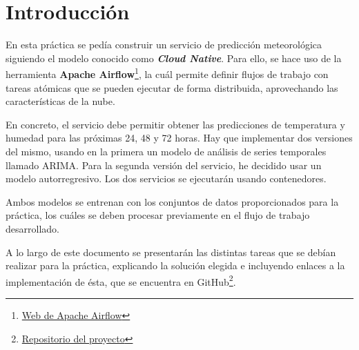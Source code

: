 \section{Introducción}
En esta práctica se pedía construir un servicio de predicción meteorológica
siguiendo el modelo conocido como \textbf{\textit{Cloud Native}}. Para ello,
se hace uso de la herramienta \textbf{Apache Airflow}\footnote{\href{https://airflow.apache.org/}{Web de Apache Airflow}},
la cuál permite definir flujos de trabajo con tareas atómicas que se pueden
ejecutar de forma distribuida, aprovechando las características de la nube.

En concreto, el servicio debe permitir obtener las predicciones de temperatura
y humedad para las próximas 24, 48 y 72 horas. Hay que implementar dos versiones
del mismo, usando en la primera un modelo de análisis de series temporales
llamado ARIMA. Para la segunda versión del servicio, he decidido usar un
modelo autorregresivo. Los dos servicios se ejecutarán usando contenedores.

Ambos modelos se entrenan con los conjuntos de datos proporcionados para la
práctica, los cuáles se deben procesar previamente en el flujo de trabajo
desarrollado.

A lo largo de este documento se presentarán las distintas tareas que se
debían realizar para la práctica, explicando la solución elegida e
incluyendo enlaces a la implementación de ésta, que se encuentra en GitHub\footnote{\href{https://github.com/varrrro/forecast}{Repositorio del proyecto}}.
